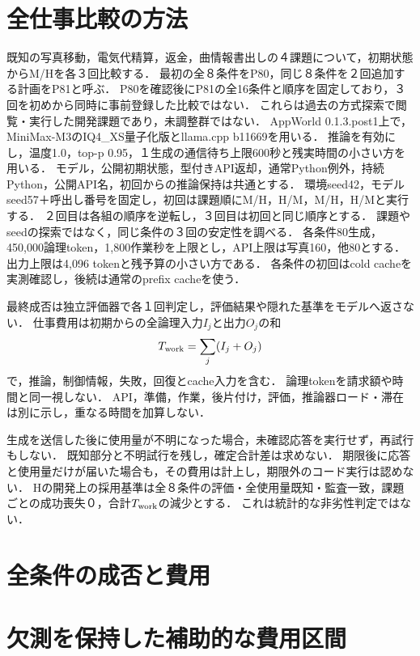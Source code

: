 \documentclass[uplatex,a4paper,twocolumn,10pt]{jsarticle}
\begin{document}
\section{全仕事比較の方法}
既知の写真移動，電気代精算，返金，曲情報書出しの４課題について，初期状態からM/Hを各３回比較する．
最初の全８条件をP80，同じ８条件を２回追加する計画をP81と呼ぶ．
P80を確認後にP81の全16条件と順序を固定しており，３回を初めから同時に事前登録した比較ではない．
これらは過去の方式探索で閲覧・実行した開発課題であり，未調整群ではない．
AppWorld 0.1.3.post1上で，MiniMax-M3のIQ4\_XS量子化版とllama.cpp b11669を用いる．
推論を有効にし，温度1.0，top-p 0.95，１生成の通信待ち上限600秒と残実時間の小さい方を用いる．
モデル，公開初期状態，型付きAPI返却，通常Python例外，持続Python，公開API名，初回からの推論保持は共通とする．
環境seed42，モデルseed57＋呼出し番号を固定し，初回は課題順にM/H，H/M，M/H，H/Mと実行する．
２回目は各組の順序を逆転し，３回目は初回と同じ順序とする．
課題やseedの探索ではなく，同じ条件の３回の安定性を調べる．
各条件80生成，450,000論理token，1,800作業秒を上限とし，API上限は写真160，他80とする．
出力上限は4,096 tokenと残予算の小さい方である．
各条件の初回はcold cacheを実測確認し，後続は通常のprefix cacheを使う．

最終成否は独立評価器で各１回判定し，評価結果や隠れた基準をモデルへ返さない．
仕事費用は初期からの全論理入力$I_j$と出力$O_j$の和
\begin{equation}T_{\rm work}=\sum_j(I_j+O_j)\end{equation}
で，推論，制御情報，失敗，回復とcache入力を含む．
論理tokenを請求額や時間と同一視しない．
API，準備，作業，後片付け，評価，推論器ロード・滞在は別に示し，重なる時間を加算しない．

生成を送信した後に使用量が不明になった場合，未確認応答を実行せず，再試行もしない．
既知部分と不明試行を残し，確定合計差は求めない．
期限後に応答と使用量だけが届いた場合も，その費用は計上し，期限外のコード実行は認めない．
Hの開発上の採用基準は全８条件の評価・全使用量既知・監査一致，課題ごとの成功喪失０，合計$T_{\rm work}$の減少とする．
これは統計的な非劣性判定ではない．

\section{全条件の成否と費用}


\section{欠測を保持した補助的な費用区間}

\end{document}
